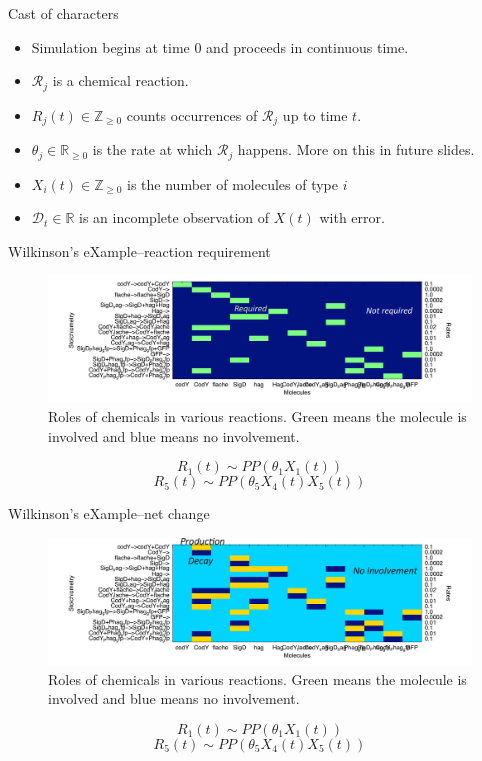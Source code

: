 \documentclass[12pt,a4paper,t,xcolor=dvipsnames,slidestop,compress,mathserif]{beamer}
\begin{document}
\begin{frame}{Cast of characters}

\begin{itemize}
\item Simulation begins at time $0$ and proceeds in continuous time.
\item $\mathcal{R}_j$ is a chemical reaction.
\item $R_j(t) \in \mathbb{Z}_{\geq 0}$ counts occurrences of $\mathcal{R}_j$ up to time $t$.
\item $\theta_j\in \mathbb{R}_{\geq 0}$ is the rate at which $\mathcal{R}_j$ happens. More on this in future slides.
\item $X_i(t)  \in \mathbb{Z}_{\geq 0}$ is the number of molecules of type $i$
\item $\mathcal{D}_t \in \mathbb{R}$ is an incomplete observation of $X(t)$ with error.
\end{itemize}

\end{frame}
\begin{frame}{Wilkinson's eXample--reaction requirement}
\begin{figure}
\includegraphics[scale=0.22]{rmat_fig.png}
\caption{\label{fig:entry} Roles of chemicals in various reactions. Green means the molecule is involved and blue means no involvement.}
\end{figure}
$$R_1(t)\sim PP(\theta_1 X_1(t))$$
$$R_5(t)\sim PP(\theta_5 X_4(t)X_5(t))$$
\end{frame}

\begin{frame}{Wilkinson's eXample--net change}
\begin{figure}
\includegraphics[scale=0.22]{sto_fig.png}
\caption{\label{fig:stoich} Roles of chemicals in various reactions. Green means the molecule is involved and blue means no involvement.}
\end{figure}
$$R_1(t)\sim PP(\theta_1 X_1(t))$$
$$R_5(t)\sim PP(\theta_5 X_4(t)X_5(t))$$
\end{frame}
\end{document}
